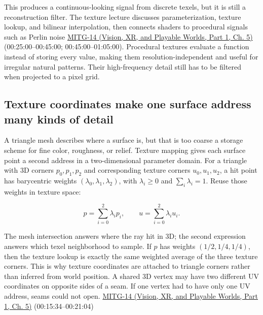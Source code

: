 This produces a continuous-looking signal from discrete texels, but it is still a reconstruction filter. The texture lecture discusses parameterization, texture lookup, and bilinear interpolation, then connects shaders to procedural signals such as Perlin noise \href{../07-Vision-XR-and-Playable-Worlds-P01/main.pdf\#nameddest=04-visual-computing-ii-ch036-mitg-14---texture-mapping}{MITG-14 (Vision, XR, and Playable Worlds, Part 1, Ch. 5)} (00:25:00--00:45:00; 00:45:00--01:05:00). Procedural textures evaluate a function instead of storing every value, making them resolution-independent and useful for irregular natural patterns. Their high-frequency detail still has to be filtered when projected to a pixel grid.

\subsection{Texture coordinates make one surface address many kinds of detail}\label{03-visual-computing-i-ch019-texture-coordinates-make-one-surface-address-many-kinds-of-detail}

\hypertarget{03-visual-computing-i-ch019-texture-coordinates-make-one-surface-address-many-kinds-of-detail}{}

A triangle mesh describes where a surface is, but that is too coarse a storage scheme for fine color, roughness, or relief. Texture mapping gives each surface point a second address in a two-dimensional parameter domain. For a triangle with 3D corners \(p_0,p_1,p_2\) and corresponding texture corners \(u_0,u_1,u_2\), a hit point has barycentric weights \((\lambda_0,\lambda_1,\lambda_2)\), with \(\lambda_i\ge 0\) and \(\sum_i\lambda_i=1\). Reuse those weights in texture space:

\[
p=\sum_{i=0}^2\lambda_i p_i,\qquad u=\sum_{i=0}^2\lambda_i u_i.
\]

The mesh intersection answers where the ray hit in 3D; the second expression answers which texel neighborhood to sample. If \(p\) has weights \((1/2,1/4,1/4)\), then the texture lookup is exactly the same weighted average of the three texture corners. This is why texture coordinates are attached to triangle corners rather than inferred from world position. A shared 3D vertex may have two different UV coordinates on opposite sides of a seam. If one vertex had to have only one UV address, seams could not open. \href{../07-Vision-XR-and-Playable-Worlds-P01/main.pdf\#nameddest=04-visual-computing-ii-ch036-mitg-14---texture-mapping}{MITG-14 (Vision, XR, and Playable Worlds, Part 1, Ch. 5)} (00:15:34--00:21:04)

